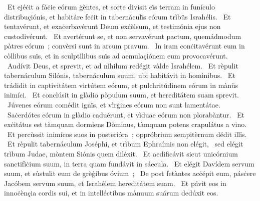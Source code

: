 {~Et ejéċit a fàċie eórum ġèntes, et sorte divísit eïs terram in funículo distribuçiónis, et habitáre feċit in tabernáculïs eórum trìbüs Israhélis. 
~Et tentavérunt, et exaċerbavérunt Deum exċèlsum, et testimónia ejus non custodivérunt. 
~Et avertérunt se, et non servavérunt pactum, quemádmodum pàtres eórum~; convèrsi sunt in arcum pravum. 
~In iram conċitavérunt eum in còllibus suïs, et in sculptìlibus suïs ad aemulaçiónem eum provocavérunt. 
~Audívit Deus, et sprevit, et ad nìhilum redégit vàlde Israhélem. 
~Et rèpulit tabernáculum Silónis, tabernáculum suum, ubi habitávit in homìnibus. 
~Et trádidit in captivitátem virtútem eórum, et pulchritúdinem eórum in mànüs inimíci. 
~Et conclúsit in glàdio pòpulum suum, et hereditátem suam sprevit. 
~Júvenes eórum comédit ignïs, et vìrġines eórum non sunt lamentátae. 
~Saċerdótes eórum in glàdio caduérunt, et vìduae eórum non plorabàntur. 
~Et exċitátus est tàmquam dormiens Dòminus, tàmquam potens crapulátus a vino. 
~Et percùssit inimícos suos in posterióra~; oppróbrium sempitèrnum dédit illïs. 
~Et rèpulit tabernáculum Joséphi, et trìbum Ephraímis non elégit, 
~sed elégit trìbum Judae, mòntem Siónis quem diléxit. 
~Et aedificávit sicut unicórnium sanctifìċium suum, in terra quam fundávit in sáecula. 
~Et elégit Davídem servum suum, et sùstulit eum de grèġibus óvium~; 
~De post fetàntes acċépit eum, pásċere Jacóbem servum suum, et Israhélem hereditátem suam. 
~Et pávit eos in innoċènçia cordis sui, et in intelléctibus mànuum suárum dedúxit eos. 
}
